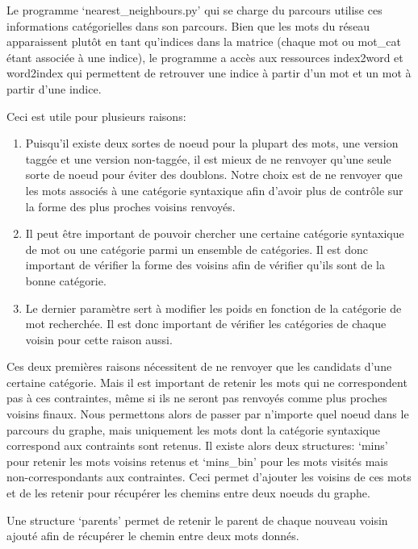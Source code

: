 Le programme \lq{nearest\_neighbours.py}\rq{} qui se charge du parcours utilise ces informations catégorielles dans son parcours. Bien que les mots du réseau apparaissent plutôt en tant qu'indices dans la matrice (chaque mot ou mot\_cat étant associée à une indice), le programme a accès aux ressources index2word et word2index qui permettent de retrouver une indice à partir d'un mot et un mot à partir d'une indice.

Ceci est utile pour plusieurs raisons:

\begin{enumerate}
    \item{Puisqu'il existe deux sortes de noeud pour la plupart des mots, une version taggée et une version non-taggée, il est mieux de ne renvoyer qu'une seule sorte de noeud pour éviter des doublons. Notre choix est de ne renvoyer que les mots associés à une catégorie syntaxique afin d'avoir plus de contrôle sur la forme des plus proches voisins renvoyés.}
    \item{Il peut être important de pouvoir chercher une certaine catégorie syntaxique de mot ou une catégorie parmi un ensemble de catégories. Il est donc important de vérifier la forme des voisins afin de vérifier qu'ils sont de la bonne catégorie.}
    \item{Le dernier paramètre sert à modifier les poids en fonction de la 
catégorie de mot recherchée. Il est donc important de vérifier les catégories 
de chaque voisin pour cette raison aussi.}
\end{enumerate}

Ces deux premières raisons nécessitent de ne renvoyer que les candidats d'une 
certaine catégorie. Mais il est important de retenir les mots qui ne 
correspondent pas à ces contraintes, même si ils ne seront pas renvoyés comme 
plus proches voisins finaux. Nous permettons alors de passer par n'importe quel 
noeud dans le parcours du graphe, mais uniquement les mots dont la catégorie 
syntaxique correspond aux contraints sont retenus. Il existe alors deux 
structures: \lq{mins}\rq{} pour retenir les mots voisins retenus et 
\lq{mins\_bin}\rq{} pour les mots visités mais non-correspondants aux 
contraintes. Ceci permet d'ajouter les voisins de ces mots et de les retenir 
pour récupérer les chemins entre deux noeuds du graphe.

Une structure \lq{parents}\rq{} permet de retenir le parent de chaque nouveau voisin ajouté afin de récupérer le chemin entre deux mots donnés.

















